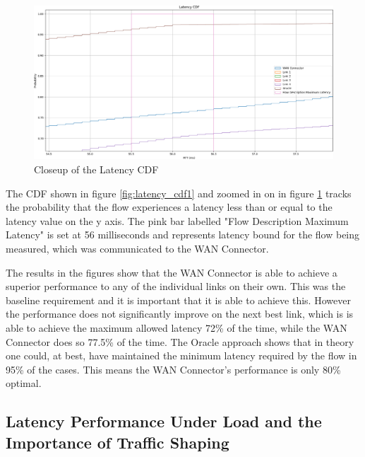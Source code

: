 \begin{figure}[h]
    \centering
        \includegraphics[height=0.66\textwidth,width=\textwidth]{fig/latency_cdf1_super_zoomed_in.png}
        \caption{Closeup of the Latency CDF}
        \label{fig:latency_cdf1_super_zoomed_in}
\end{figure}

The CDF shown in figure \ref{fig:latency_cdf1} and zoomed in on in figure \ref{fig:latency_cdf1_super_zoomed_in} tracks the probability that the flow experiences a latency less than or equal to the latency value on the y axis. The pink bar labelled "Flow Description Maximum Latency" is set at 56 milliseconds and represents latency bound for the flow being measured, which was communicated to the WAN Connector.


The results in the figures show that the WAN Connector is able to achieve a superior performance to any of the individual links on their own. This was the baseline requirement and it is important that it is able to achieve this. However the performance does not significantly improve on the next best link, which is is able to achieve the maximum allowed latency 72\% of the time, while the WAN Connector does so 77.5\% of the time. The Oracle approach shows that in theory one could, at best, have maintained the minimum latency required by the flow in 95\% of the cases. This means the WAN Connector's performance is only 80\% optimal.


\subsection{Latency Performance Under Load and the Importance of Traffic Shaping}

